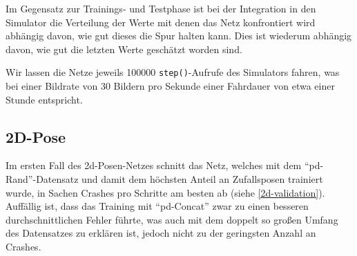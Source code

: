 Im Gegensatz zur Trainings- und Testphase ist bei der Integration in den Simulator die Verteilung der Werte mit denen das Netz konfrontiert wird abhängig davon, wie gut dieses die Spur halten kann. Dies ist wiederum abhängig davon, wie gut die letzten Werte geschätzt worden sind.

Wir lassen die Netze jeweils 100000 \texttt{step()}-Aufrufe des Simulators fahren, was bei einer Bildrate von 30 Bildern pro Sekunde einer Fahrdauer von etwa einer Stunde entspricht.\\

\subsection{2D-Pose}

Im ersten Fall des \acs{2d}-Posen-Netzes schnitt das Netz, welches mit dem ``\acs{pd}-Rand''-Datensatz und damit dem höchsten Anteil an Zufallsposen trainiert wurde, in Sachen Crashes pro Schritte am besten ab (siehe \ref{2d-validation}). Auffällig ist, dass das Training mit ``\acs{pd}-Concat'' zwar zu einen besseren durchschnittlichen Fehler führte, was auch mit dem doppelt so großen Umfang des Datensatzes zu erklären ist, jedoch nicht zu der geringsten Anzahl an Crashes.  

